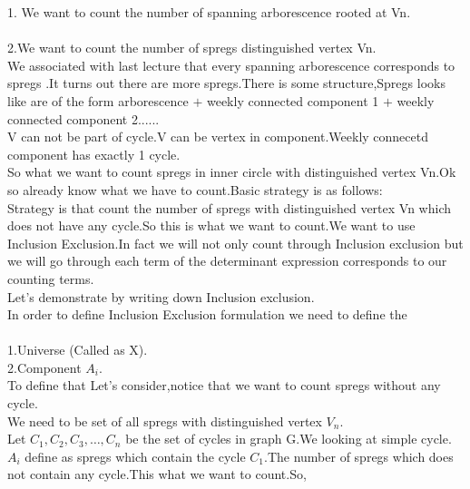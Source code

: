 1. We want to count the number of spanning arborescence rooted at Vn.\\ \\
2.We want to count the number of spregs distinguished vertex Vn.\\
We associated with last lecture that every spanning arborescence corresponds to spregs .It turns out there are more spregs.There is some structure,Spregs looks like are of the form arborescence $+$ weekly connected component 1 $+$ weekly connected component 2......\\
V can not be part of cycle.V can be vertex in component.Weekly connecetd component has exactly 1 cycle.\\
So what we want to count spregs in inner circle with distinguished vertex Vn.Ok so already know what we have to count.Basic strategy is as follows:\\
Strategy is that count the number of spregs with distinguished vertex Vn which does not have any cycle.So this is what we want to count.We want to use Inclusion Exclusion.In fact we will not only count through Inclusion exclusion but we will go through each term of the determinant expression corresponds to our counting terms.\\
Let's demonstrate by writing down Inclusion exclusion.\\
In order to define Inclusion Exclusion formulation we need to define the \\ \\
1.Universe (Called as X).\\
2.Component $A_i$.\\
To define that Let's consider,notice that we want to count spregs without any cycle.\\
We need to be set of all spregs with distinguished vertex $V_n$.\\
Let $C_1,C_2,C_3, \dots , C_n$ be the set of cycles in graph G.We looking at simple cycle.\\
$A_i$ define as spregs which contain the cycle $C_1$.The number of spregs which does not contain any cycle.This what we want to count.So,\\

